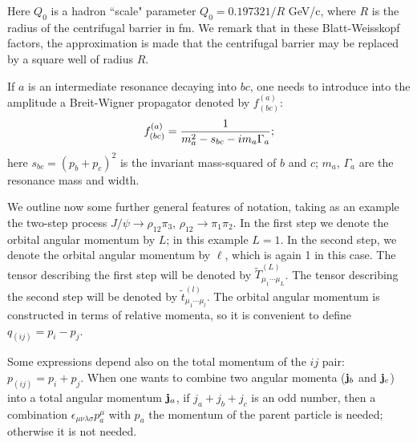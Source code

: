 Here $Q_0$ is a hadron ``scale" parameter $Q_0 = 0.197321/R$
GeV/c, where $R$ is the radius of the centrifugal barrier in fm.
We remark that in these Blatt-Weisskopf factors, the approximation
is made that the centrifugal barrier may be replaced by a square
well of radius $R$.

If $a$ is an intermediate resonance decaying into $bc$, one needs
to introduce into the amplitude a Breit-Wigner propagator denoted
by $f^{(a)}_{(bc)}$:
\begin{equation}
f^{(a)}_{(bc)}={1\over m_a^2-s_{bc}-im_a\Gamma_a};
\end{equation}
here $s_{bc}=(p_b+p_c)^2$ is the invariant mass-squared of $b$ and
$c$; $m_a$, $\Gamma_a$ are the resonance mass and width.

We outline now some further general features of notation, taking
as an example the two-step process $J/\psi \to \rho _{12}\pi _3$,
$\rho _{12} \to \pi _1\pi _2$. In the first step we denote the
orbital angular momentum by $L$; in this example $L= 1$. In the
second step, we denote the orbital angular momentum by $\ell $,
which is again 1 in this case. The tensor describing the first
step will be denoted by $\tilde T^{(L)}_{\mu_1\cdots\mu_L}$. The
tensor describing the second step will be denoted by $\tilde
t^{(l)}_{\mu_1\cdots\mu_l}$. The orbital angular momentum is
constructed in terms of relative momenta, so it is convenient to
define $q_{(ij)}=p_i-p_j$.

Some expressions depend also on the total momentum of the $ij$
pair: $p_{(ij)}=p_i+p_j$. When one wants to combine two angular
momenta (${\bf j}_b$ and ${\bf j}_c$) into a total angular
momentum ${\bf j}_a$, if $j_a+j_b+j_c$ is an odd number, then a
combination $\epsilon_{\mu\nu\lambda\sigma}p_a^\mu$ with $p_a$ the
momentum of the parent particle is needed; otherwise it is not
needed.

